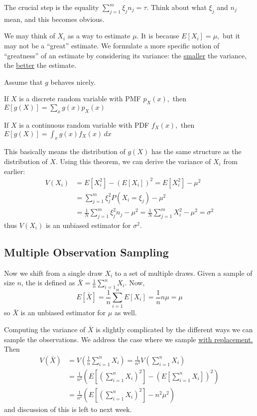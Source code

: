 \documentclass{article}
\begin{document}
The crucial step is the equality $\displaystyle\sum_{j=1}^m \xi_j n_j = \tau.$ Think about what $\xi_j$ and $n_j$ mean, and this becomes obvious. 

We may think of $X_i$ as a way to estimate $\mu.$ It is  because $E[X_i]=\mu,$ but it may not be a ``great'' estimate. We formulate a more specific notion of ``greatness'' of an estimate by considering its variance: the \ul{smaller} the variance, the \ul{better} the estimate. 

\begin{theorem}
	Assume that $g$ behaves nicely. 
	\begin{itemize}
			\ii If $X$ is a discrete random variable with PMF $p_X(x),$ then $\displaystyle E[g(X)] = \sum_{x}g(x) p_X(x)$
			
			\ii If $X$ is a continuous random variable with PDF $f_X(x),$ then $\displaystyle E[g(X)]=\int_x g(x) f_X(x)\, dx$
	\end{itemize}
\end{theorem}

This basically means the distribution of $g(X)$ has the same structure as the distribution of $X.$ Using this theorem, we can derive the variance of $X_i$ from earlier:
\begin{align*}
	V(X_i) &= E[X_i^2]-(E[X_i])^2 = E[X_i^2]-\mu^2 \\
	&= \sum_{j=1}^m \xi_j^2 P(X_i = \xi_j)-\mu^2 \\
	&= \frac{1}{N}\sum_{j=1}^m \xi_j^2 n_j - \mu^2 = \frac{1}{N}\sum_{j=1}^m X_i^2 - \mu^2 = \sigma^2
\end{align*} thus $V(X_i)$ is an unbiased estimator for $\sigma^2.$ 

\subsection{Multiple Observation Sampling}
Now we shift from a single draw $X_i$ to a set of multiple draws. Given a sample of size $n$, the  is defined as $\displaystyle\bar{X}=\frac{1}{n}\sum_{i=1}^n X_i.$ Now, \[E[\bar{X}] = \frac{1}{n}\sum_{i=1}^n E[X_i] = \frac{1}{n}n\mu=\mu\] so $\bar{X}$ is an unbiased estimator for $\mu$ as well. 

Computing the variance of $\bar{X}$ is slightly complicated by the different ways we can sample the observations. We address the case where we sample \ul{with replacement.} Then 
\begin{align*}
	V(\bar{X}) &= V\left( \frac{1}{n}\sum_{i=1}^n X_i \right) = \frac{1}{n^2}V\left( \sum_{i=1}^n X_i\right) \\
	&= \frac{1}{n^2}\left( E\left[ \left( \sum_{i=1}^n X_i \right)^2 \right] - \left( E\left[ \sum_{i=1}^n X_i \right] \right)^2 \right) \\
	&= \frac{1}{n^2}\left( E\left[ \left( \sum_{i=1}^n X_i \right)^2 \right]-n^2\mu^2 \right)
\end{align*} and discussion of this is left to next week.
\end{document}

